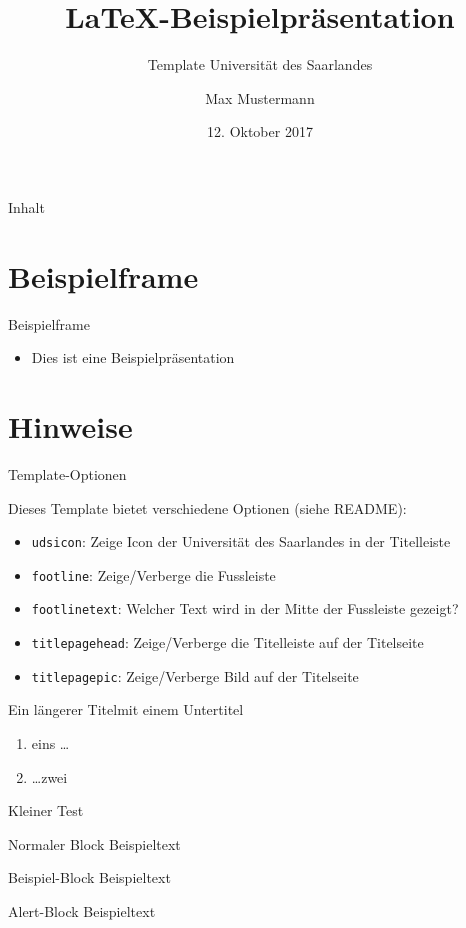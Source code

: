 \documentclass{beamer}
\author[Mustermann]{Max Mustermann}
\title{\LaTeX-Beispielpräsentation}
\subtitle{Template Universität des Saarlandes}
\institute[UdS]{Universität des Saarlandes}
\date[12.10.2017]{12. Oktober 2017}
\begin{document}
\begin{frame}
  \titlepage
\end{frame}

\begin{frame}{Inhalt}
  \tableofcontents
\end{frame}

\section{Beispielframe}

\begin{frame}{Beispielframe}
  \begin{itemize}
    \item Dies ist eine Beispielpräsentation
  \end{itemize}
\end{frame}

\section{Hinweise}

\begin{frame}{Template-Optionen}

  Dieses Template bietet verschiedene Optionen (siehe README):
	
	\begin{itemize}
    \item \texttt{udsicon}: Zeige Icon der Universität des Saarlandes in der
      Titelleiste
    \item \texttt{footline}: Zeige/Verberge die Fussleiste
    \item \texttt{footlinetext}: Welcher Text wird in der Mitte der Fussleiste
      gezeigt?
    \item \texttt{titlepagehead}: Zeige/Verberge die Titelleiste auf der
      Titelseite
    \item \texttt{titlepagepic}: Zeige/Verberge Bild auf der Titelseite
	\end{itemize}
	
\end{frame}

\begin{frame}{Ein längerer Titel}{mit einem Untertitel}
  \begin{enumerate}
    \item eins \ldots 
    \item \ldots zwei
  \end{enumerate}
\end{frame}

\begin{frame}{Kleiner Test}

  \begin{block}{Normaler Block}
    Beispieltext
  \end{block}

  \begin{exampleblock}{Beispiel-Block}
    Beispieltext
  \end{exampleblock}

  \begin{alertblock}{Alert-Block}
    Beispieltext
  \end{alertblock}

\end{frame}
\end{document}
